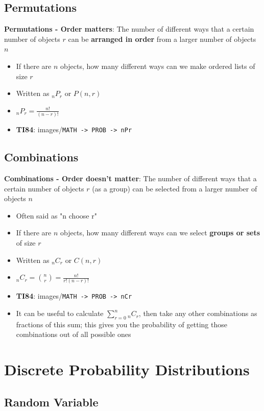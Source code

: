 \documentclass{article}
\newcommand{\code}[1]{images/\colorbox{light-gray}{\texttt{#1}}}
\begin{document}
\subsection{Permutations}

\textbf{Permutations - Order matters}: The number of different ways that a certain number of objects $r$ can be \textbf{arranged in order} from a larger number of objects $n$

 \begin{itemize}
    \item If there are $n$ objects, how many different ways can we make ordered lists of size $r$
    \item Written as $_nP_r$ or $P(n,r)$
    \item $_nP_r=\frac{n!}{(n-r)!}$
    \item \textbf{TI84}: \code{MATH -> PROB -> nPr}
\end{itemize}

\subsection{Combinations}

\textbf{Combinations - Order doesn't matter}: The number of different ways that a certain number of objects $r$ (as a group) can be selected from a larger number of objects $n$

\begin{itemize}
    \item Often said as "n choose r"
    \item If there are $n$ objects, how many different ways can we select \textbf{groups or sets} of size $r$
    \item Written as $_nC_r$ or $C(n,r)$
    \item $_nC_r=\binom{n}{r}=\frac{n!}{r!(n-r)!}$
    \item \textbf{TI84}: \code{MATH -> PROB -> nCr}
    \item It can be useful to calculate $\sum_{r=0}^{n}{_nC_r}$, then take any other combinations as fractions of this sum; this gives you the probability of getting those combinations out of all possible ones
\end{itemize}

\section{Discrete Probability Distributions}

\subsection{Random Variable}
\end{document}
